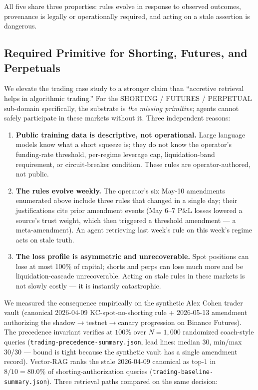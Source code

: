 \documentclass[runningheads]{llncs}
\begin{document}
All five share three properties: rules evolve in response to observed
outcomes, provenance is legally or operationally required, and acting on a
stale assertion is dangerous.

\subsection{Required Primitive for Shorting, Futures, and Perpetuals}
\label{sec:shorts-required}

We elevate the trading case study to a stronger claim than ``accretive
retrieval helps in algorithmic trading.'' For the SHORTING / FUTURES /
PERPETUAL sub-domain specifically, the substrate is \emph{the missing
primitive}; agents cannot safely participate in these markets without it.
Three independent reasons:

\begin{enumerate}
  \item \textbf{Public training data is descriptive, not operational.}
        Large language models know what a short squeeze is; they do not
        know the operator's funding-rate threshold, per-regime leverage
        cap, liquidation-band requirement, or
        circuit-breaker condition. These rules are operator-authored,
        not public.
  \item \textbf{The rules evolve weekly.} The operator's six May-10
        amendments enumerated above include three rules that changed
        in a single day; their justifications cite prior amendment
        events (May 6--7 P\&L losses lowered a source's trust weight,
        which then triggered a threshold amendment --- a
        meta-amendment). An agent retrieving last week's rule on
        this week's regime acts on stale truth.
  \item \textbf{The loss profile is asymmetric and unrecoverable.}
        Spot positions can lose at most 100\% of capital; shorts and
        perps can lose much more and be liquidation-cascade
        unrecoverable. Acting on stale rules in these markets is not
        slowly costly --- it is instantly catastrophic.
\end{enumerate}

We measured the consequence empirically on the synthetic Alex Cohen
trader vault (canonical 2026-04-09 KC-spot-no-shorting rule + 2026-05-13
amendment authorizing the shadow$\rightarrow$testnet$\rightarrow$canary
progression on Binance Futures). The precedence invariant verifies at
$100\%$ over $N{=}1{,}000$ randomized coach-style queries
(\texttt{trading-precedence-summary.json}, lead lines: median 30, min/max
30/30 --- bound is tight because the synthetic vault has a single amendment
record). Vector-RAG ranks the stale 2026-04-09 canonical as top-$1$ in
$8/10 = 80.0\%$ of shorting-authorization queries
(\texttt{trading-baseline-summary.json}). Three retrieval paths compared
on the same decision:
\end{document}
